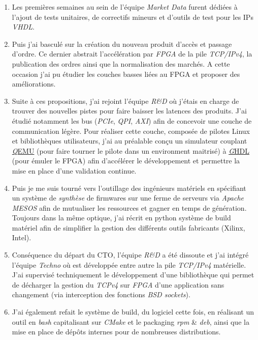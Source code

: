 \documentclass[10pt]{article}
\begin{document}
\begin{enumerate}
\item Les premières semaines au sein de l'équipe \textit{Market Data}
  furent dédiées à l'ajout de tests unitaires, de correctifs mineurs
  et d'outils de test pour les IPs \textit{VHDL}.

\item Puis j'ai basculé sur la création du nouveau
  produit d'accès et passage d'ordre. Ce dernier abstrait
  l'accélération par \textit{FPGA} de la pile \textit{TCP/IPv4}, la publication
  des ordres ainsi que la normalisation des marchés.
  A cette occasion j'ai pu étudier les couches basses
  liées au FPGA et proposer des améliorations.

\item Suite à ces propositions, j'ai rejoint l'équipe \textit{R\&D}
  où j'étais en charge de trouver des nouvelles pistes pour
  faire baisser les latences des produits.
  J'ai étudié notamment les bus (\textit{PCIe}, \textit{QPI}, \textit{AXI})
  afin de concevoir une couche de communication légère.
  Pour réaliser cette couche, composée de pilotes Linux et
  bibliothèques utilisateurs, j'ai au préalable conçu un simulateur
  couplant \href{http://qemu.org}{\textit QEMU} (pour faire tourner le pilote
  dans un environment maitrisé) à \href{http://ghdl.free.fr/}{\textit GHDL}
  (pour émuler le FPGA) afin d'accélérer le développement et permettre
  la mise en place d'une validation continue.

\item Puis je me suis tourné vers l'outillage des ingénieurs matériels en 
  spécifiant un système de \textit{synthèse} de firmwares sur une
  ferme de serveurs via \textit{Apache MESOS} afin de mutualiser les
  ressources et gagner en temps de génération.
  Toujours dans la même optique, j'ai récrit en python système de build
  matériel afin de simplifier la gestion des différents outils
  fabricants (Xilinx, Intel).

\item Conséquence du départ du CTO, l'équipe \textit{R\&D} a été dissoute
  et j'ai intégré l'équipe \textit{Techno} où est développée entre autre
  la pile \textit{TCP/IPv4} matérielle. J'ai supervisé techniquement 
  le développement d'une bibliothèque qui permet de décharger la gestion
  du \textit{TCPv4} sur \textit{FPGA} d'une application sans changement
  (via interception des fonctions \textit{BSD sockets}).

\item J'ai également refait le système de build, du logiciel cette fois,
  en réalisant un outil en \textit{bash} capitalisant sur \textit{CMake}
  et le packaging \textit{rpm} \& \textit{deb}, ainsi que la mise en place
  de dépôts internes pour de nombreuses distributions.
  

\end{enumerate}
\end{document}
